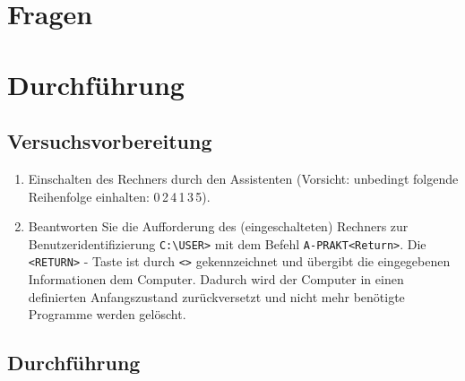 \section{Fragen}




\section{Durchführung}


\subsection{Versuchsvorbereitung}

\begin{enumerate}

\item Einschalten des Rechners durch den Assistenten (Vorsicht:
unbedingt folgende Reihenfolge einhalten: 0\,2\,4\,1\,3\,5).

\item Beantworten Sie die Aufforderung des (eingeschalteten)
Rechners zur Benutzeridentifizierung \verb|C:\USER>| mit dem Befehl
\verb|A-PRAKT<Return>|. Die \verb|<RETURN>| - Taste ist durch \verb|<>|
gekennzeichnet und übergibt die eingegebenen Informationen dem
Computer. Dadurch wird der Computer in einen definierten Anfangszustand
zurückversetzt und nicht mehr benötigte Programme werden gelöscht.

\end{enumerate}




\subsection{Durchführung}

